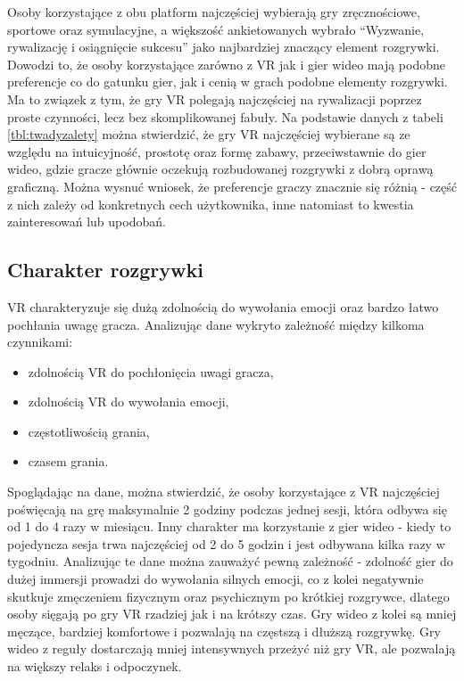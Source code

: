 Osoby korzystające z obu platform najczęściej wybierają gry zręcznościowe, sportowe oraz symulacyjne, a większość ankietowanych wybrało ``Wyzwanie, rywalizację i osiągnięcie sukcesu'' jako najbardziej znaczący element rozgrywki. Dowodzi to, że osoby korzystające zarówno z VR jak i gier wideo mają podobne preferencje co do gatunku gier, jak i cenią w grach podobne elementy rozgrywki. Ma to związek z tym, że gry VR polegają najczęściej na rywalizacji poprzez proste czynności, lecz bez skomplikowanej fabuły. Na podstawie danych z tabeli \ref{tbl:twadyzalety} można stwierdzić, że gry VR najczęściej wybierane są ze względu na intuicyjność, prostotę oraz formę zabawy, przeciwstawnie do gier wideo, gdzie gracze głównie oczekują rozbudowanej rozgrywki z dobrą oprawą graficzną. Można wysnuć wniosek, że preferencje graczy znacznie się różnią - część z nich zależy od konkretnych cech użytkownika, inne natomiast to kwestia zainteresowań lub upodobań.


\subsection{Charakter rozgrywki}

VR charakteryzuje się dużą zdolnością do wywołania emocji oraz bardzo łatwo pochłania uwagę gracza. Analizując dane wykryto zależność między kilkoma czynnikami:
\begin{itemize}
  \item zdolnością VR do pochłonięcia uwagi gracza,
  \item zdolnością VR do wywołania emocji,
  \item częstotliwością grania,
  \item czasem grania.
\end{itemize}

Spoglądając na dane, można stwierdzić, że osoby korzystające z VR najczęściej poświęcają na grę maksymalnie 2 godziny podczas jednej sesji, która odbywa się od 1 do 4 razy w miesiącu. Inny charakter ma korzystanie z gier wideo - kiedy to pojedyncza sesja trwa najczęściej od 2 do 5 godzin i jest odbywana kilka razy w tygodniu. Analizując te dane można zauważyć pewną zależność - zdolność gier do dużej immersji prowadzi do wywołania silnych emocji, co z kolei negatywnie skutkuje zmęczeniem fizycznym oraz psychicznym po krótkiej rozgrywce, dlatego osoby sięgają po gry VR rzadziej jak i na krótszy czas. Gry wideo z kolei są mniej męczące, bardziej komfortowe i pozwalają na częstszą i dłuższą rozgrywkę. Gry wideo z reguły dostarczają mniej intensywnych przeżyć niż gry VR, ale pozwalają na większy relaks i odpoczynek. 

